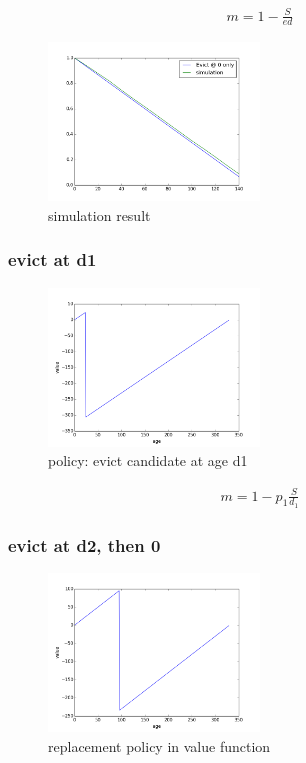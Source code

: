 \documentclass[12pt, letterpaper]{article}
\begin{document}
\begin{equation}
\begin{aligned}
m = 1 - \frac{S}{ed}
\end{aligned}
\end{equation}

\begin{figure}[H]
\centering
\includegraphics[width=0.5\textwidth]{sim_mru}
\caption{simulation result}
\end{figure}

\subsubsection{evict at d1}

\begin{figure}[H]
\centering
\includegraphics[width=0.5\textwidth]{evict_d1}
\caption{policy: evict candidate at age d1}
\end{figure}

\begin{equation}
\begin{aligned}
m = 1 - p_1 \frac{S}{d_1}
\end{aligned}
\end{equation}

\subsubsection{evict at d2, then 0}

\begin{figure}[H]
\centering
\includegraphics[width=0.5\textwidth]{evict_d2.png}
\caption{replacement policy in value function}
\end{figure}
\end{document}
